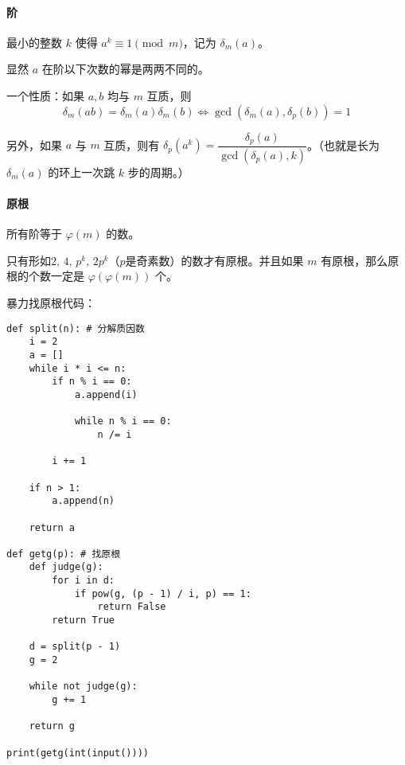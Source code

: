 \paragraph{阶} 最小的整数 $k$ 使得 $a ^ k \equiv 1 \pmod m$，记为 $\delta_m(a)$。

显然 $a$ 在阶以下次数的幂是两两不同的。

一个性质：如果 $a, b$ 均与 $m$ 互质，则
$$\delta_m(ab)=\delta_m(a)\delta_m(b) \iff \gcd\left(\delta_m(a),\delta_p(b)\right) = 1$$

另外，如果 $a$ 与 $m$ 互质，则有 $\delta_p(a^k)=\dfrac{\delta_p(a)}{\gcd\left(\delta_p(a),k\right)}$。（也就是长为 $\delta_m(a)$ 的环上一次跳 $k$ 步的周期。）

\paragraph{原根} 所有阶等于 $\varphi(m)$ 的数。

只有形如$2,\, 4,\, p^k,\, 2 p^k$（$p$是奇素数）的数才有原根。并且如果 $m$ 有原根，那么原根的个数一定是 $\varphi\left(\varphi(m)\right)$ 个。

暴力找原根代码：

\begin{verbatim}
def split(n): # 分解质因数
    i = 2
    a = []
    while i * i <= n:
        if n % i == 0:
            a.append(i)

            while n % i == 0:
                n /= i

        i += 1

    if n > 1:
        a.append(n)

    return a
    
def getg(p): # 找原根
    def judge(g):
        for i in d:
            if pow(g, (p - 1) / i, p) == 1:
                return False
        return True

    d = split(p - 1)
    g = 2

    while not judge(g):
        g += 1

    return g

print(getg(int(input())))
\end{verbatim}
